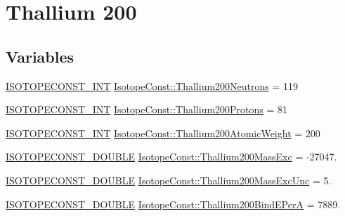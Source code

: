 \hypertarget{group___isotope_const-_thallium-_tl200}{}\section{Thallium 200}
\label{group___isotope_const-_thallium-_tl200}
\subsection*{Variables}
\begin{DoxyCompactItemize}
\item 
\mbox{\hyperlink{group___isotope_const-_macros_ga5f18360b3e99483a35c32d789e62621c}{I\+S\+O\+T\+O\+P\+E\+C\+O\+N\+S\+T\+\_\+\+I\+NT}} \mbox{\hyperlink{group___isotope_const-_thallium-_tl200_ga57ab99a283de474c1144613aafe82d11}{Isotope\+Const\+::\+Thallium200\+Neutrons}} = 119
\item 
\mbox{\hyperlink{group___isotope_const-_macros_ga5f18360b3e99483a35c32d789e62621c}{I\+S\+O\+T\+O\+P\+E\+C\+O\+N\+S\+T\+\_\+\+I\+NT}} \mbox{\hyperlink{group___isotope_const-_thallium-_tl200_gac08aaf5e6f5fd1f41c22272996e2721d}{Isotope\+Const\+::\+Thallium200\+Protons}} = 81
\item 
\mbox{\hyperlink{group___isotope_const-_macros_ga5f18360b3e99483a35c32d789e62621c}{I\+S\+O\+T\+O\+P\+E\+C\+O\+N\+S\+T\+\_\+\+I\+NT}} \mbox{\hyperlink{group___isotope_const-_thallium-_tl200_gaef2016277a224e4cf8cfaa37c015f988}{Isotope\+Const\+::\+Thallium200\+Atomic\+Weight}} = 200
\item 
\mbox{\hyperlink{group___isotope_const-_macros_ga8f45a7272ce02c0b4c65c44636ed719a}{I\+S\+O\+T\+O\+P\+E\+C\+O\+N\+S\+T\+\_\+\+D\+O\+U\+B\+LE}} \mbox{\hyperlink{group___isotope_const-_thallium-_tl200_ga1dcd3422c3b058d487acda3015f347a6}{Isotope\+Const\+::\+Thallium200\+Mass\+Exc}} = -\/27047.
\item 
\mbox{\hyperlink{group___isotope_const-_macros_ga8f45a7272ce02c0b4c65c44636ed719a}{I\+S\+O\+T\+O\+P\+E\+C\+O\+N\+S\+T\+\_\+\+D\+O\+U\+B\+LE}} \mbox{\hyperlink{group___isotope_const-_thallium-_tl200_ga2e5fd0caaaae7742735bd1265944d6ec}{Isotope\+Const\+::\+Thallium200\+Mass\+Exc\+Unc}} = 5.
\item 
\mbox{\hyperlink{group___isotope_const-_macros_ga8f45a7272ce02c0b4c65c44636ed719a}{I\+S\+O\+T\+O\+P\+E\+C\+O\+N\+S\+T\+\_\+\+D\+O\+U\+B\+LE}} \mbox{\hyperlink{group___isotope_const-_thallium-_tl200_ga85a769c1c844faf10017a559c31a6047}{Isotope\+Const\+::\+Thallium200\+Bind\+E\+PerA}} = 7889.
\item 

\end{DoxyCompactItemize}
